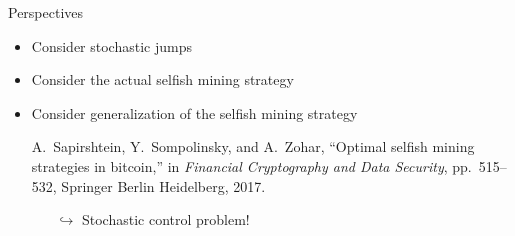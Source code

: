 \documentclass{beamer}
\begin{document}
\begin{frame}{Perspectives}
\begin{itemize}
  \item Consider stochastic jumps
  \item Consider the actual selfish mining strategy
  \item Consider generalization of the selfish mining strategy
  \tiny \begin{thebibliography}{1}

A.~Sapirshtein, Y.~Sompolinsky, and A.~Zohar, ``Optimal selfish mining
  strategies in bitcoin,'' in {\em Financial Cryptography and Data Security},
  pp.~515--532, Springer Berlin Heidelberg, 2017.

\end{thebibliography}
\begin{itemize}
  \item[$\hookrightarrow$] Stochastic control problem!
\end{itemize}
\end{itemize}
\end{frame}
\begin{frame}


\end{frame}
\end{document}
